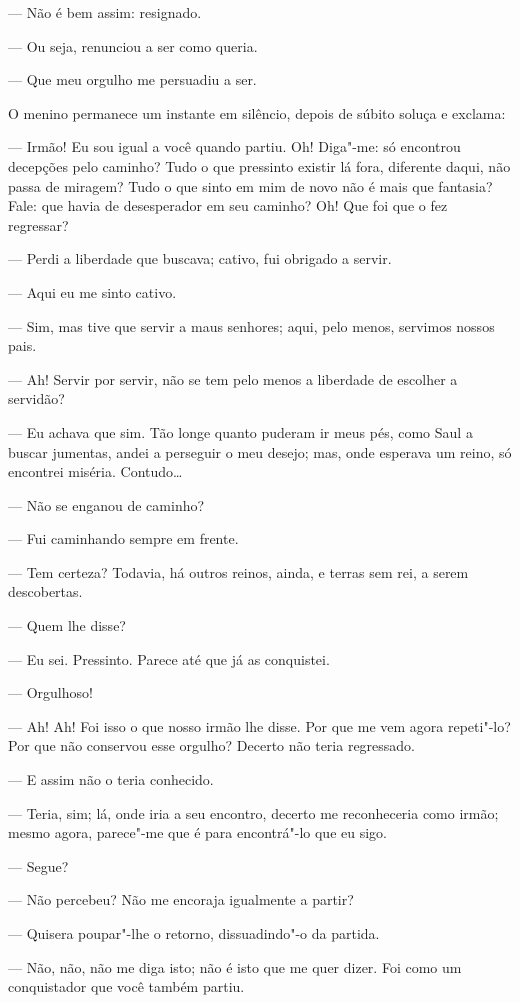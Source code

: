--- Não é bem assim: resignado.

--- Ou seja, renunciou a ser como queria.

--- Que meu orgulho me persuadiu a ser.

O menino permanece um instante em silêncio, depois de súbito soluça e
exclama:

--- Irmão! Eu sou igual a você quando partiu. Oh! Diga"-me: só encontrou
decepções pelo caminho? Tudo o que pressinto existir lá fora, diferente
daqui, não passa de miragem? Tudo o que sinto em mim de novo não é mais
que fantasia? Fale: que havia de desesperador em seu caminho? Oh! Que
foi que o fez regressar?

--- Perdi a liberdade que buscava; cativo, fui obrigado a servir.

--- Aqui eu me sinto cativo.

--- Sim, mas tive que servir a maus senhores; aqui, pelo menos, servimos
nossos pais.

--- Ah! Servir por servir, não se tem pelo menos a liberdade de escolher a
servidão?

--- Eu achava que sim. Tão longe quanto puderam ir meus pés, como Saul a
buscar jumentas, andei a perseguir o meu desejo; mas, onde esperava um
reino, só encontrei miséria. Contudo\ldots{}

--- Não se enganou de caminho?

--- Fui caminhando sempre em frente.

--- Tem certeza? Todavia, há outros reinos, ainda, e terras sem rei, a
serem descobertas.

--- Quem lhe disse?

--- Eu sei. Pressinto. Parece até que já as conquistei.

--- Orgulhoso!

--- Ah! Ah! Foi isso o que nosso irmão lhe disse. Por que me vem agora
repeti"-lo? Por que não conservou esse orgulho? Decerto não teria
regressado.

--- E assim não o teria conhecido.

--- Teria, sim; lá, onde iria a seu encontro, decerto me reconheceria como
irmão; mesmo agora, parece"-me que é para encontrá"-lo que eu sigo.

--- Segue?

--- Não percebeu? Não me encoraja igualmente a partir?

--- Quisera poupar"-lhe o retorno, dissuadindo"-o da partida.

--- Não, não, não me diga isto; não é isto que me quer dizer. Foi como um
conquistador que você também partiu.


